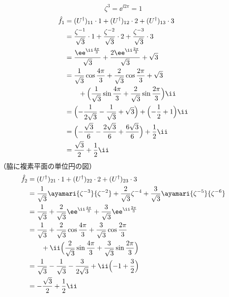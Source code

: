 \[ \zeta^{3}=\ee^{\ii2\pi}=1 \]
\begin{align*}
  \hat{f}_1&=(U^{\dagger})_{11}\cdot1+(U^{\dagger})_{12}\cdot2+(U^{\dagger})_{13}\cdot3\\
  &=\frac{\zeta^{-1}}{\sqrt{3}}\cdot1+\frac{\zeta^{-2}}{\sqrt{3}}\cdot2+\frac{\zeta^{-3}}{\sqrt{3}}\cdot3\\
  &=\frac{\ee^{\ii\frac{4\pi}{3}}}{\sqrt{3}}+\frac{2\ee^{\ii\frac{2\pi}{3}}}{\sqrt{3}}+\sqrt{3}\\
  &=\frac{1}{\sqrt{3}}\cos\frac{4\pi}{3}+\frac{2}{\sqrt{3}}\cos\frac{2\pi}{3}+\sqrt{3}\\
  &\qquad+\Bigl(\frac{1}{\sqrt{3}}\sin\frac{4\pi}{3}+\frac{2}{\sqrt{3}}\sin\frac{2\pi}{3}\Bigr)\ii\\
  &=\Bigl(-\frac{1}{2\sqrt{3}}-\frac{1}{\sqrt{3}}+\sqrt{3}\Bigr)+\Bigl(-\frac{1}{2}+1\Bigr)\ii\\
  &=\Bigl(-\frac{\sqrt{3}}{6}-\frac{2\sqrt{3}}{6}+\frac{6\sqrt{3}}{6}\Bigr)+\frac{1}{2}\ii\\
  &=\frac{\sqrt{3}}{2}+\frac{1}{2}\ii
\end{align*}
（脇に複素平面の単位円の図）
\begin{align*}
  \hat{f}_2&=(U^{\dagger})_{21}\cdot1+(U^{\dagger})_{22}\cdot2+(U^{\dagger})_{23}\cdot3\\
  &=\frac{1}{\sqrt{3}}\ayamari{\zeta^{-3}}{\zeta^{-2}}+\frac{2}{\sqrt{3}}\zeta^{-4}+\frac{3}{\sqrt{3}}\ayamari{\zeta^{-5}}{\zeta^{-6}}\\
  &=\frac{1}{\sqrt{3}}+\frac{2}{\sqrt{3}}\ee^{\ii\frac{4\pi}{3}}+\frac{3}{\sqrt{3}}\ee^{\ii\frac{2\pi}{3}}\\
  &=\frac{1}{\sqrt{3}}+\frac{2}{\sqrt{3}}\cos\frac{4\pi}{3}+\frac{3}{\sqrt{3}}\cos\frac{2\pi}{3}\\
  &\qquad+\ii\Bigl(\frac{2}{\sqrt{3}}\sin\frac{4\pi}{3}+\frac{3}{\sqrt{3}}\sin\frac{2\pi}{3}\Bigr)\\
  &=\frac{1}{\sqrt{3}}-\frac{1}{\sqrt{3}}-\frac{3}{2\sqrt{3}}+\ii\Bigl(-1+\frac{3}{2}\Bigr)\\
  &=-\frac{\sqrt{3}}{2}+\frac{1}{2}\ii
\end{align*}

